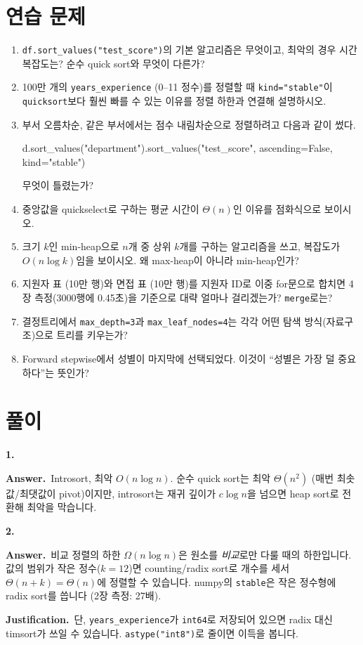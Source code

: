 \documentclass[11pt,a4paper]{article}
\newcommand{\code}[1]{\texttt{#1}}
\newcommand{\Ans}{\par\textbf{Answer.}\ }
\newcommand{\Just}{\par\textbf{Justification.}\ }
\begin{document}
\section{연습 문제}
\begin{enumerate}
\item \code{df.sort\_values("test\_score")}의 기본 알고리즘은 무엇이고, 최악의 경우 시간복잡도는? 순수 quick sort와 무엇이 다른가?
\item 100만 개의 \code{years\_experience} (0–11 정수)를 정렬할 때 \code{kind="stable"}이 \code{quicksort}보다 훨씬 빠를 수 있는 이유를 정렬 하한과 연결해 설명하시오.
\item 부서 오름차순, 같은 부서에서는 점수 내림차순으로 정렬하려고 다음과 같이 썼다.
\begin{codebox}
d.sort\_values("department").sort\_values("test\_score", ascending=False, kind="stable")
\end{codebox}
 무엇이 틀렸는가?
\item 중앙값을 quickselect로 구하는 평균 시간이 $\Theta(n)$인 이유를 점화식으로 보이시오.
\item 크기 $k$인 min-heap으로 $n$개 중 상위 $k$개를 구하는 알고리즘을 쓰고, 복잡도가 $O(n\log k)$임을 보이시오. 왜 max-heap이 아니라 min-heap인가?
\item 지원자 표 (10만 행)와 면접 표 (10만 행)를 지원자 ID로 이중 for문으로 합치면 4장 측정(3000행에 0.45초)을 기준으로 대략 얼마나 걸리겠는가? \code{merge}로는?
\item 결정트리에서 \code{max\_depth=3}과 \code{max\_leaf\_nodes=4}는 각각 어떤 탐색 방식(자료구조)으로 트리를 키우는가?
\item Forward stepwise에서 성별이 마지막에 선택되었다. 이것이 ``성별은 가장 덜 중요하다''는 뜻인가?
\end{enumerate}

\section{풀이}
\textbf{1.}
\Ans Introsort, 최악 $O(n\log n)$. 순수 quick sort는 최악 $\Theta(n^2)$ (매번 최솟값/최댓값이 pivot)이지만, introsort는 재귀 깊이가 $c\log n$을 넘으면 heap sort로 전환해 최악을 막습니다.

\textbf{2.}
\Ans 비교 정렬의 하한 $\Omega(n\log n)$은 원소를 \emph{비교}로만 다룰 때의 하한입니다. 값의 범위가 작은 정수($k=12$)면 counting/radix sort로 개수를 세서 $\Theta(n+k)=\Theta(n)$에 정렬할 수 있습니다. numpy의 \code{stable}은 작은 정수형에 radix sort를 씁니다 (2장 측정: 27배).
\Just 단, \code{years\_experience}가 \code{int64}로 저장되어 있으면 radix 대신 timsort가 쓰일 수 있습니다. \code{astype("int8")}로 줄이면 이득을 봅니다.
\end{document}
